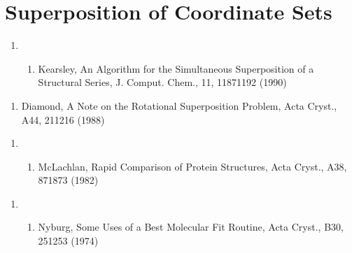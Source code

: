 \documentclass[letterpaper,11pt,english]{sphinxmanual}
\begin{document}
\section{Superposition of Coordinate Sets}
\label{\detokenize{text/references:superposition-of-coordinate-sets}}\begin{enumerate}
%
\setcounter{enumi}{18}
\item {} \begin{enumerate}
%
\setcounter{enumii}{9}
\item {} 
Kearsley, An Algorithm for the Simultaneous Superposition of a Structural Series, J. Comput. Chem., 11, 1187\sphinxhyphen{}1192 (1990)

\end{enumerate}

\end{enumerate}
\begin{enumerate}
%
\setcounter{enumi}{17}
\item {} 
Diamond, A Note on the Rotational Superposition Problem, Acta Cryst., A44, 211\sphinxhyphen{}216 (1988)

\end{enumerate}
\begin{enumerate}
%
\item {} \begin{enumerate}
%
\setcounter{enumii}{3}
\item {} 
McLachlan, Rapid Comparison of Protein Structures, Acta Cryst., A38, 871\sphinxhyphen{}873 (1982)

\end{enumerate}

\end{enumerate}
\begin{enumerate}
%
\setcounter{enumi}{18}
\item {} \begin{enumerate}
%
\setcounter{enumii}{2}
\item {} 
Nyburg, Some Uses of a Best Molecular Fit Routine, Acta Cryst., B30, 251\sphinxhyphen{}253 (1974)

\end{enumerate}

\end{enumerate}
\end{document}
